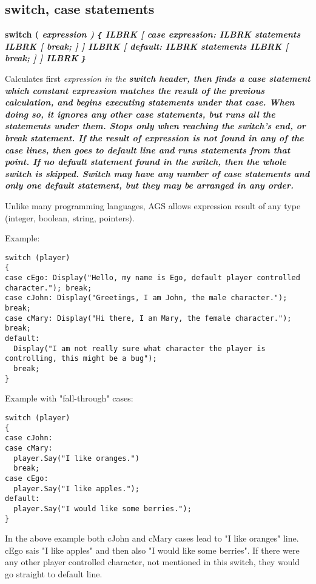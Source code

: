 \subsection{switch, case statements}\label{switchstatement}%

\bf{switch (} \it{expression} \bf{)}  \verb${$ ILBRK
  [
  \bf{case} \it{expression}: ILBRK
    \it{statements} ILBRK
    [ \bf{break}; ]
  ] ILBRK
  [
  \bf{default:} ILBRK
    \it{statements} ILBRK
    [ \bf{break}; ]
  ]  ILBRK
\verb$}$

Calculates first \it{expression} in the \bf{switch} header, then finds a \bf{case} statement
which \it{constant expression} matches the \it{result} of the previous calculation, and begins
executing statements under that \bf{case}. When doing so, it ignores any other \bf{case} statements,
but runs all the statements under them. Stops only when reaching the switch's end, or \bf{break}
statement.
If the result of \it{expression} is not found in any of the \bf{case} lines, then goes to \bf{default}
line and runs statements from that point. If no \bf{default} statement found in the switch, then
the whole switch is skipped.
\bf{Switch} may have any number of \bf{case} statements and only one \bf{default} statement, but
they may be arranged in any order.

Unlike many programming languages, AGS allows expression result of any type (integer, boolean,
string, pointers).

Example:

\begin{verbatim}
switch (player)
{
case cEgo: Display("Hello, my name is Ego, default player controlled character."); break;
case cJohn: Display("Greetings, I am John, the male character."); break;
case cMary: Display("Hi there, I am Mary, the female character."); break;
default:
  Display("I am not really sure what character the player is controlling, this might be a bug");
  break;
}
\end{verbatim}

Example with "fall-through" cases:

\begin{verbatim}
switch (player)
{
case cJohn:
case cMary:
  player.Say("I like oranges.")
  break;
case cEgo:
  player.Say("I like apples.");
default:
  player.Say("I would like some berries.");
}
\end{verbatim}
In the above example both cJohn and cMary cases lead to "I like oranges" line.
cEgo sais "I like apples" and then also "I would like some berries". If there were any other player
controlled character, not mentioned in this switch, they would go straight to default line.


